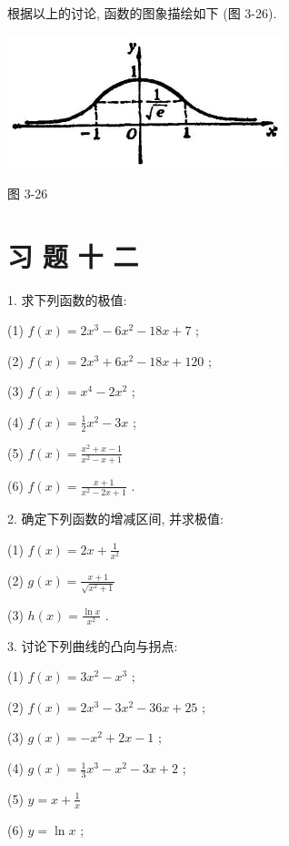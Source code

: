 \documentclass[10pt]{article}
\begin{document}
根据以上的讨论, 函数的图象描绘如下 (图 3-26).

\begin{center}
\includegraphics[max width=0.6\textwidth]{images/01912c18-5c3f-733d-b775-749ba9897a9d_174_141078.jpg}
\end{center}

图 3-26

\section*{习 题 十 二}

1. 求下列函数的极值:

(1) \(f\left( x\right) = 2{x}^{3} - 6{x}^{2} - {18x} + 7\) ;

(2) \(f\left( x\right) = 2{x}^{3} + 6{x}^{2} - {18x} + {120}\) ;

(3) \(f\left( x\right) = {x}^{4} - 2{x}^{2}\) ;

(4) \(f\left( x\right) = \frac{1}{2}{x}^{2} - {3x}\) ;

(5) \(f\left( x\right) = \frac{{x}^{2} + x - 1}{{x}^{2} - x + 1}\)

(6) \(f\left( x\right) = \frac{x + 1}{{x}^{2} - {2x} + 1}\) .

2. 确定下列函数的增减区间, 并求极值:

(1) \(f\left( x\right) = {2x} + \frac{1}{{x}^{2}}\)

(2) \(g\left( x\right) = \frac{x + 1}{\sqrt{{x}^{2} + 1}}\)

(3) \(h\left( x\right) = \frac{\ln x}{{x}^{2}}\) .

3. 讨论下列曲线的凸向与拐点:

(1) \(f\left( x\right) = 3{x}^{2} - {x}^{3}\) ;

(2) \(f\left( x\right) = 2{x}^{3} - 3{x}^{2} - {36x} + {25}\) ;

(3) \(g\left( x\right) = - {x}^{2} + {2x} - 1\) ;

(4) \(g\left( x\right) = \frac{1}{3}{x}^{3} - {x}^{2} - {3x} + 2\) ;

(5) \(y = x + \frac{1}{x}\)

(6) \(y = \ln x\) ;
\end{document}

